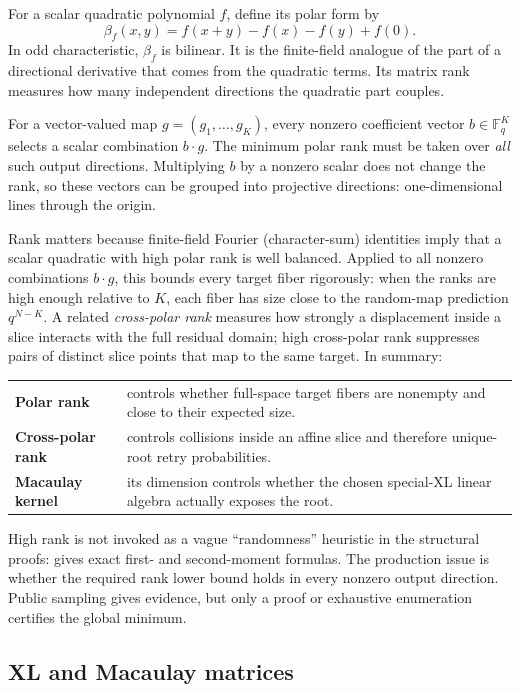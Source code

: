 \documentclass[11pt]{article}
\newcommand{\F}{\mathbb F}
\begin{document}
For a scalar quadratic polynomial $f$, define its polar form by
\[
  \beta_f(x,y)=f(x+y)-f(x)-f(y)+f(0).
\]
In odd characteristic, $\beta_f$ is bilinear.  It is the finite-field analogue
of the part of a directional derivative that comes from the quadratic terms.
Its matrix rank measures how many independent directions the quadratic part
couples.

For a vector-valued map $g=(g_1,\ldots,g_K)$, every nonzero coefficient vector
$b\in\F_q^K$ selects a scalar combination $b\cdot g$.  The minimum polar rank
must be taken over \emph{all} such output directions.  Multiplying $b$ by a nonzero scalar does not change the rank, so these
vectors can be grouped into projective directions: one-dimensional lines
through the origin.

Rank matters because finite-field Fourier (character-sum) identities imply
that a scalar quadratic with high polar rank is well balanced.  Applied to all
nonzero combinations $b\cdot g$, this bounds every target fiber rigorously:
when the ranks are high enough relative to $K$, each fiber has size close to
the random-map prediction $q^{N-K}$.  A related \emph{cross-polar rank}
measures how strongly a displacement inside a slice interacts with the full
residual domain; high cross-polar rank suppresses pairs of distinct slice
points that map to the same target.  In summary:
\begin{center}
\begin{tabularx}{0.91\textwidth}{@{}>{\bfseries}p{}X@{}}
Polar rank & controls whether full-space target fibers are nonempty and close
to their expected size.\\
Cross-polar rank & controls collisions inside an affine slice and therefore
unique-root retry probabilities.\\
Macaulay kernel & its dimension controls whether the chosen special-XL linear
algebra actually exposes the root.
\end{tabularx}
\end{center}
High rank is not invoked as a vague ``randomness'' heuristic in the structural
proofs:  gives exact first- and second-moment formulas.  The
production issue is whether the required rank lower bound holds in every
nonzero output direction.  Public sampling gives evidence, but only a proof or
exhaustive enumeration certifies the global minimum.

\subsection{XL and Macaulay matrices}\label{sec:xl-primer}
\end{document}
